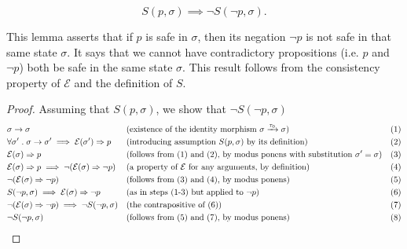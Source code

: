 \documentclass{article}
\theoremstyle{definition}
\begin{document}
\vspace{5mm}

\begin{lemma}
$$
S(p,\sigma) \implies \neg{S(\neg{p},\sigma)}.
$$
\end{lemma}

This lemma asserts that if $p$ is safe in $\sigma$, then its negation $\neg{p}$ is not safe in that same state $\sigma$. It says that we cannot have contradictory propositions (i.e. $p$ and $\neg{p}$) both be safe in the same state $\sigma$. This result follows from the consistency property of $\mathcal{E}$ and the definition of $S$.

\begin{proof}
  Assuming that $S(p,\sigma)$, we show that $\neg{S(\neg{p},\sigma)}$
  \begin{align*}
    &\sigma \to \sigma &&\text{(existence of the identity morphism  $\sigma \xrightarrow[]{\tau_0} \sigma$)} &&\text{(1)} \\
    &\forall \sigma' \hspace{1mm}.\hspace{1mm}\sigma \to \sigma' \implies \mathcal{E}(\sigma') \Rightarrow p &&\text{(introducing assumption $S(p, \sigma)$ by its definition) }   &&\text{(2)} \\
    &\mathcal{E}(\sigma) \Rightarrow p &&\text{(follows from (1) and (2), by modus ponens with substitution $\sigma' = \sigma$)} &&\text{(3)}\\
    &\mathcal{E}(\sigma) \Rightarrow p \implies \neg{(\mathcal{E}(\sigma) \Rightarrow \neg{p})} &&\text{(a property of $\mathcal{E}$ for any arguments, by definition)}  &&\text{(4)} \\
    &\neg{(\mathcal{E}(\sigma) \Rightarrow \neg{p})} &&\text{(follows from (3) and (4), by modus ponens)} &&\text{(5)}\\
    &S(\neg{p},\sigma) \implies \mathcal{E}(\sigma) \Rightarrow \neg{p} &&\text{(as in steps (1-3) but applied to $\neg{p}$)}   &&\text{(6)} \\
    &\neg{(\mathcal{E}(\sigma) \Rightarrow \neg{p})} \implies \neg{S(\neg{p},\sigma)} &&\text{(the contrapositive of (6))}  &&\text{(7)} \\
    &\neg{S(\neg{p},\sigma)}  \hspace{5mm} \qedhere&&\text{(follows from (5) and (7), by modus ponens)}   &&\text{(8)}
  \end{align*}
\end{proof}

\vspace{5mm}
\end{document}
